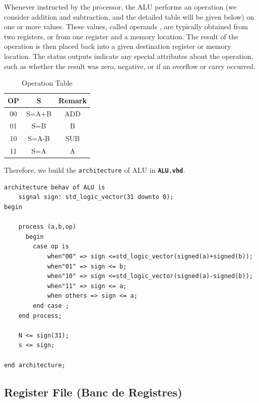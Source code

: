 Whenever instructed by the processor, the ALU performs an operation 
(we consider addition and subtraction, and the detailed table will be given below) on one or more values. These values, called operands , 
are typically obtained from two registers, or from one register and a memory location. 
The result of the operation is then placed back into a given destination register 
or memory location. The status outputs indicate any special attributes about the operation, 
such as whether the result was zero, negative, or if an overflow or carry occurred. \cite{catsoulis2005designing} 
\vspace{2cm}
\begin{table}[htbp]
    \centering
    \caption{Operation Table}
    \label{tab: Operation Table}
    \begin{tabular}{@{}ccc@{}}
    \toprule
    \textbf{OP} & \textbf{S} & \textbf{Remark} \\ \midrule
    00              & S=A+B      & ADD             \\
    01              & S=B        & B               \\
    10              & S=A-B      & SUB             \\
    11              & S=A        & A               \\ \bottomrule
    \end{tabular}
\end{table}

Therefore, we build the \texttt{architecture} of ALU in \texttt{\bf{ALU.vhd}}.

\begin{lstlisting}[style=vhdl,columns=fixed]
architecture behav of ALU is
    signal sign: std_logic_vector(31 downto 0);
begin 

    process (a,b,op)
      begin 
        case op is 
            when"00" => sign <=std_logic_vector(signed(a)+signed(b)); 
            when"01" => sign <= b; 
            when"10" => sign <=std_logic_vector(signed(a)-signed(b)); 
            when"11" => sign <= a;
            when others => sign <= a; 
        end case ;
    end process;

    N <= sign(31);
    s <= sign;

end architecture; 
\end{lstlisting}

\subsection{Register File (Banc de Registres)}

